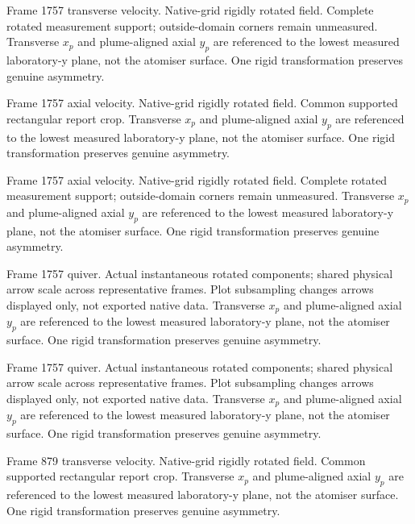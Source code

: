 \caption{Frame 1757 transverse velocity. Native-grid rigidly rotated field. Complete rotated measurement support; outside-domain corners remain unmeasured. Transverse $x_p$ and plume-aligned axial $y_p$ are referenced to the lowest measured laboratory-y plane, not the atomiser surface. One rigid transformation preserves genuine asymmetry.}

\caption{Frame 1757 axial velocity. Native-grid rigidly rotated field. Common supported rectangular report crop. Transverse $x_p$ and plume-aligned axial $y_p$ are referenced to the lowest measured laboratory-y plane, not the atomiser surface. One rigid transformation preserves genuine asymmetry.}

\caption{Frame 1757 axial velocity. Native-grid rigidly rotated field. Complete rotated measurement support; outside-domain corners remain unmeasured. Transverse $x_p$ and plume-aligned axial $y_p$ are referenced to the lowest measured laboratory-y plane, not the atomiser surface. One rigid transformation preserves genuine asymmetry.}

\caption{Frame 1757 quiver. Actual instantaneous rotated components; shared physical arrow scale across representative frames. Plot subsampling changes arrows displayed only, not exported native data. Transverse $x_p$ and plume-aligned axial $y_p$ are referenced to the lowest measured laboratory-y plane, not the atomiser surface. One rigid transformation preserves genuine asymmetry.}

\caption{Frame 1757 quiver. Actual instantaneous rotated components; shared physical arrow scale across representative frames. Plot subsampling changes arrows displayed only, not exported native data. Transverse $x_p$ and plume-aligned axial $y_p$ are referenced to the lowest measured laboratory-y plane, not the atomiser surface. One rigid transformation preserves genuine asymmetry.}

\caption{Frame 879 transverse velocity. Native-grid rigidly rotated field. Common supported rectangular report crop. Transverse $x_p$ and plume-aligned axial $y_p$ are referenced to the lowest measured laboratory-y plane, not the atomiser surface. One rigid transformation preserves genuine asymmetry.}

